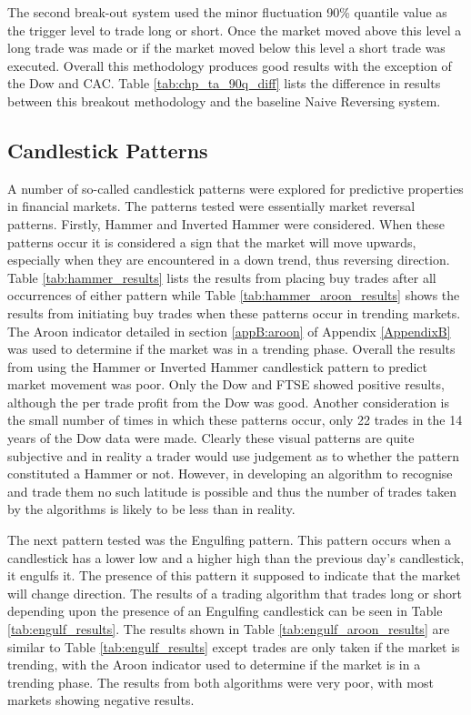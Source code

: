 

The second break-out system used the minor fluctuation 90\% quantile value as the trigger level to trade long or short. Once the market moved above this level a long trade was made or if the market moved below this level a short trade was executed. Overall this methodology produces good results with the exception of the Dow and CAC. Table \ref{tab:chp_ta_90q_diff} lists the difference in results between this breakout methodology and the baseline Naive Reversing system.



\subsection{Candlestick Patterns}
A number of so-called candlestick patterns were explored for predictive properties in financial markets. The patterns tested were essentially market reversal patterns. Firstly, Hammer and Inverted Hammer were considered. When these patterns occur it is considered a sign that the market will move upwards, especially when they are encountered in a down trend, thus reversing direction. Table \ref{tab:hammer_results} lists the results from placing buy trades after all occurrences of either pattern while Table \ref{tab:hammer_aroon_results} shows the results from initiating buy trades when these patterns occur in trending markets. The Aroon indicator detailed in section \ref{appB:aroon} of Appendix \ref{AppendixB} was used to determine if the market was in a trending phase. Overall the results from using the Hammer or Inverted Hammer candlestick pattern to predict market movement was poor. Only the Dow and FTSE showed positive results, although the per trade profit from the Dow was good. Another consideration is the small number of times in which these patterns occur, only 22 trades in the 14 years of the Dow data were made.  Clearly these visual patterns are quite subjective and in reality a trader would use judgement as to whether the pattern constituted a Hammer or not. However, in developing an algorithm to recognise and trade them no such latitude is possible and thus the number of trades taken by the algorithms is likely to be less than in reality.

The next pattern tested was the Engulfing pattern. This pattern occurs when a candlestick has a lower low and a higher high than the previous day's candlestick, it engulfs it. The presence of this pattern it supposed to indicate that the market will change direction. The results of a trading algorithm that trades long or short depending upon the presence of an Engulfing candlestick can be seen in Table \ref{tab:engulf_results}. The results shown in Table \ref{tab:engulf_aroon_results} are similar to Table \ref{tab:engulf_results} except trades are only taken if the market is trending, with the Aroon indicator used to determine if the market is in a trending phase. The results from both algorithms were very poor, with most markets showing negative results.

